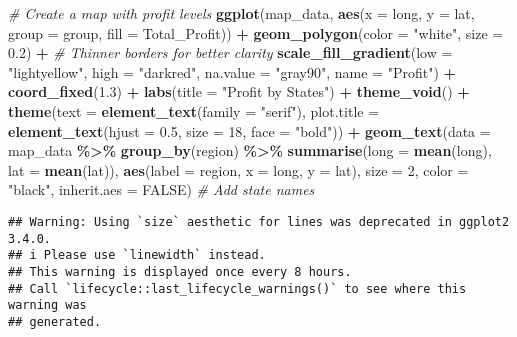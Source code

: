 \documentclass[
]{article}
\newenvironment{Shaded}{\begin{snugshade}}{\end{snugshade}}
\newcommand{\AttributeTok}[1]{\textcolor[rgb]{0.13,0.29,0.53}{#1}}
\newcommand{\CommentTok}[1]{\textcolor[rgb]{0.56,0.35,0.01}{\textit{#1}}}
\newcommand{\ConstantTok}[1]{\textcolor[rgb]{0.56,0.35,0.01}{#1}}
\newcommand{\DecValTok}[1]{\textcolor[rgb]{0.00,0.00,0.81}{#1}}
\newcommand{\FloatTok}[1]{\textcolor[rgb]{0.00,0.00,0.81}{#1}}
\newcommand{\FunctionTok}[1]{\textcolor[rgb]{0.13,0.29,0.53}{\textbf{#1}}}
\newcommand{\NormalTok}[1]{#1}
\newcommand{\SpecialCharTok}[1]{\textcolor[rgb]{0.81,0.36,0.00}{\textbf{#1}}}
\newcommand{\StringTok}[1]{\textcolor[rgb]{0.31,0.60,0.02}{#1}}
\begin{document}
\begin{Shaded}
\begin{Highlighting}[]
\CommentTok{\# Create a map with profit levels}
\FunctionTok{ggplot}\NormalTok{(map\_data, }\FunctionTok{aes}\NormalTok{(}\AttributeTok{x =}\NormalTok{ long, }\AttributeTok{y =}\NormalTok{ lat, }\AttributeTok{group =}\NormalTok{ group, }\AttributeTok{fill =}\NormalTok{ Total\_Profit)) }\SpecialCharTok{+}
  \FunctionTok{geom\_polygon}\NormalTok{(}\AttributeTok{color =} \StringTok{"white"}\NormalTok{, }\AttributeTok{size =} \FloatTok{0.2}\NormalTok{) }\SpecialCharTok{+}  \CommentTok{\# Thinner borders for better clarity}
  \FunctionTok{scale\_fill\_gradient}\NormalTok{(}\AttributeTok{low =} \StringTok{"lightyellow"}\NormalTok{, }\AttributeTok{high =} \StringTok{"darkred"}\NormalTok{, }\AttributeTok{na.value =} \StringTok{"gray90"}\NormalTok{, }\AttributeTok{name =} \StringTok{"Profit"}\NormalTok{) }\SpecialCharTok{+} 
  \FunctionTok{coord\_fixed}\NormalTok{(}\FloatTok{1.3}\NormalTok{) }\SpecialCharTok{+} 
  \FunctionTok{labs}\NormalTok{(}\AttributeTok{title =} \StringTok{"Profit by States"}\NormalTok{) }\SpecialCharTok{+}
  \FunctionTok{theme\_void}\NormalTok{() }\SpecialCharTok{+}
  \FunctionTok{theme}\NormalTok{(}\AttributeTok{text =} \FunctionTok{element\_text}\NormalTok{(}\AttributeTok{family =} \StringTok{"serif"}\NormalTok{),}
        \AttributeTok{plot.title =} \FunctionTok{element\_text}\NormalTok{(}\AttributeTok{hjust =} \FloatTok{0.5}\NormalTok{, }\AttributeTok{size =} \DecValTok{18}\NormalTok{, }\AttributeTok{face =} \StringTok{"bold"}\NormalTok{)) }\SpecialCharTok{+}
  \FunctionTok{geom\_text}\NormalTok{(}\AttributeTok{data =}\NormalTok{ map\_data }\SpecialCharTok{\%\textgreater{}\%}
              \FunctionTok{group\_by}\NormalTok{(region) }\SpecialCharTok{\%\textgreater{}\%}
              \FunctionTok{summarise}\NormalTok{(}\AttributeTok{long =} \FunctionTok{mean}\NormalTok{(long), }\AttributeTok{lat =} \FunctionTok{mean}\NormalTok{(lat)),}
            \FunctionTok{aes}\NormalTok{(}\AttributeTok{label =}\NormalTok{ region, }\AttributeTok{x =}\NormalTok{ long, }\AttributeTok{y =}\NormalTok{ lat), }\AttributeTok{size =} \DecValTok{2}\NormalTok{, }\AttributeTok{color =} \StringTok{"black"}\NormalTok{, }\AttributeTok{inherit.aes =} \ConstantTok{FALSE}\NormalTok{)  }\CommentTok{\# Add state names}
\end{Highlighting}
\end{Shaded}

\begin{verbatim}
## Warning: Using `size` aesthetic for lines was deprecated in ggplot2 3.4.0.
## i Please use `linewidth` instead.
## This warning is displayed once every 8 hours.
## Call `lifecycle::last_lifecycle_warnings()` to see where this warning was
## generated.
\end{verbatim}
\end{document}

